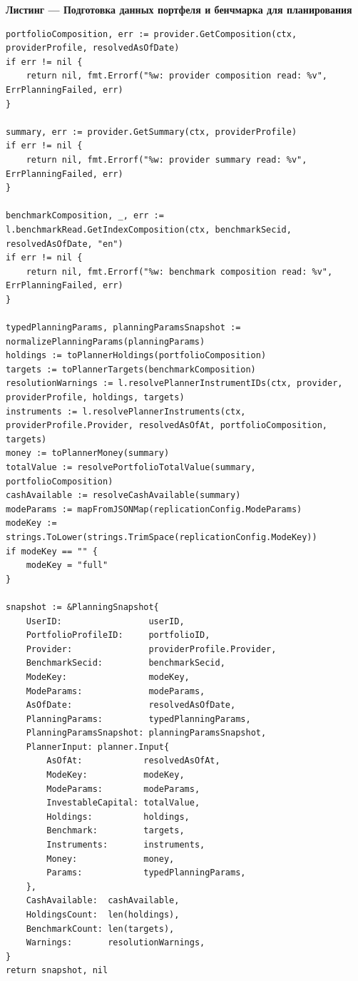 \documentclass[14pt]{gost-7-32}
\newcounter{codelisting}
\newcommand{\codelistingcaption}[1]{%
  \refstepcounter{codelisting}%
  \noindent\textbf{Листинг \thecodelisting{} --- #1}\par\vspace{0.4em}%
}
\begin{document}
\codelistingcaption{Подготовка данных портфеля и бенчмарка для планирования}
\begin{lstlisting}
portfolioComposition, err := provider.GetComposition(ctx, providerProfile, resolvedAsOfDate)
if err != nil {
    return nil, fmt.Errorf("%w: provider composition read: %v", ErrPlanningFailed, err)
}

summary, err := provider.GetSummary(ctx, providerProfile)
if err != nil {
    return nil, fmt.Errorf("%w: provider summary read: %v", ErrPlanningFailed, err)
}

benchmarkComposition, _, err := l.benchmarkRead.GetIndexComposition(ctx, benchmarkSecid, resolvedAsOfDate, "en")
if err != nil {
    return nil, fmt.Errorf("%w: benchmark composition read: %v", ErrPlanningFailed, err)
}

typedPlanningParams, planningParamsSnapshot := normalizePlanningParams(planningParams)
holdings := toPlannerHoldings(portfolioComposition)
targets := toPlannerTargets(benchmarkComposition)
resolutionWarnings := l.resolvePlannerInstrumentIDs(ctx, provider, providerProfile, holdings, targets)
instruments := l.resolvePlannerInstruments(ctx, providerProfile.Provider, resolvedAsOfAt, portfolioComposition, targets)
money := toPlannerMoney(summary)
totalValue := resolvePortfolioTotalValue(summary, portfolioComposition)
cashAvailable := resolveCashAvailable(summary)
modeParams := mapFromJSONMap(replicationConfig.ModeParams)
modeKey := strings.ToLower(strings.TrimSpace(replicationConfig.ModeKey))
if modeKey == "" {
    modeKey = "full"
}

snapshot := &PlanningSnapshot{
    UserID:                 userID,
    PortfolioProfileID:     portfolioID,
    Provider:               providerProfile.Provider,
    BenchmarkSecid:         benchmarkSecid,
    ModeKey:                modeKey,
    ModeParams:             modeParams,
    AsOfDate:               resolvedAsOfDate,
    PlanningParams:         typedPlanningParams,
    PlanningParamsSnapshot: planningParamsSnapshot,
    PlannerInput: planner.Input{
        AsOfAt:            resolvedAsOfAt,
        ModeKey:           modeKey,
        ModeParams:        modeParams,
        InvestableCapital: totalValue,
        Holdings:          holdings,
        Benchmark:         targets,
        Instruments:       instruments,
        Money:             money,
        Params:            typedPlanningParams,
    },
    CashAvailable:  cashAvailable,
    HoldingsCount:  len(holdings),
    BenchmarkCount: len(targets),
    Warnings:       resolutionWarnings,
}
return snapshot, nil
\end{lstlisting}
\end{document}

